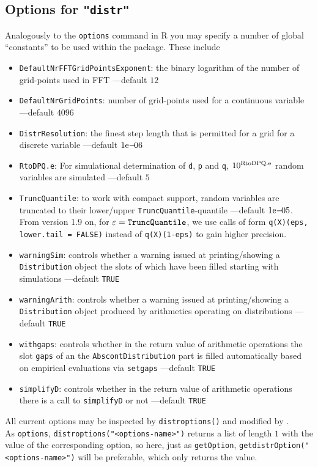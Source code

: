 \documentclass[11pt]{article}
\newcommand{\code}[1]{{\tt #1}}
\newcommand{\pkg}[1]{{\tt "#1"}}
\begin{document}
\subsection[Options for distr]{Options for \pkg{distr}}
%
Analogously to the \code{options} command in {\sf R} you may specify a number of
global ``constants'' to be used within the package. These include
\begin{itemize}
  \item \code{DefaultNrFFTGridPointsExponent}: the binary logarithm of the
        number of grid-points used in FFT ---default $12$
  \item \code{DefaultNrGridPoints}: number of grid-points used for a continuous
        variable ---default $4096$
  \item \code{DistrResolution}: the finest step length that is permitted for a
        grid for a discrete variable ---default $1{\rm e-}\!06$
  \item \code{RtoDPQ.e}: For simulational determination of \code{d}, \code{p}
         and \code{q}, $10^{\rm RtoDPQ.e}$ random variables are
  simulated ---default $5$
  \item \code{TruncQuantile}: to work with compact support, random variables are
        truncated to their lower/upper
  \code{TruncQuantile}-quantile   ---default $1{\rm e-}\!05$.\\
  From version 1.9 on, for $\varepsilon={\tt \code{TruncQuantile}}$, we use calls of form
  \code{q(X)(eps, lower.tail = FALSE)} instead of   \code{q(X)(1-eps)} to gain higher
  precision.
  \item \code{warningSim}: controls whether a warning issued at printing/showing
        a \code{Distribution} object the slots of which have been
  filled starting with simulations ---default \code{TRUE}
  \item \code{warningArith}: controls whether a warning issued at
   printing/showing a \code{Distribution} object produced by arithmetics
  operating on distributions ---default \code{TRUE}
  \item \code{withgaps}: controls whether in the return value of arithmetic
  operations the slot \code{gaps} of an the \code{AbscontDistribution} part
  is filled automatically based on empirical evaluations via  \code{setgaps}
   ---default \code{TRUE}
  \item \code{simplifyD}: controls whether in the return value of arithmetic
  operations there is a call to \code{simplifyD} or not ---default \code{TRUE}
\end{itemize}
All current options may be inspected by \code{distroptions()}  and modified by
 \linebreak[4] \code{distroptions("<options-name>"=<value>)}.\\
As \code{options},  \code{distroptions("<options-name>")} returns a list of
 length $1$ with the value of the corresponding option,
so here, just as \code{getOption},  \code{getdistrOption("<options-name>")} will
 be preferable, which only returns the value.
\end{document}
